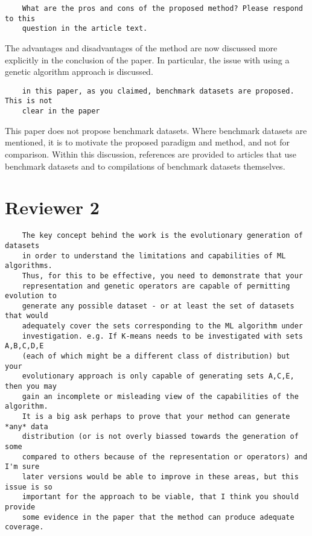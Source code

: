 \documentclass[11pt]{article}
\begin{document}
\begin{tcolorbox}
\begin{verbatim}
    What are the pros and cons of the proposed method? Please respond to this
    question in the article text.
\end{verbatim}
\end{tcolorbox}

The advantages and disadvantages of the method are now discussed more explicitly
in the conclusion of the paper. In particular, the issue with using a genetic
algorithm approach is discussed.\\


\begin{tcolorbox}
\begin{verbatim}
    in this paper, as you claimed, benchmark datasets are proposed. This is not
    clear in the paper
\end{verbatim}
\end{tcolorbox}

This paper does not propose benchmark datasets. Where benchmark datasets are
mentioned, it is to motivate the proposed paradigm and method, and not for
comparison. Within this discussion, references are provided to articles that use
benchmark datasets and to compilations of benchmark datasets themselves.

\section*{Reviewer 2}

\begin{tcolorbox}
\begin{verbatim}
    The key concept behind the work is the evolutionary generation of datasets
    in order to understand the limitations and capabilities of ML algorithms.
    Thus, for this to be effective, you need to demonstrate that your
    representation and genetic operators are capable of permitting evolution to
    generate any possible dataset - or at least the set of datasets that would
    adequately cover the sets corresponding to the ML algorithm under
    investigation. e.g. If K-means needs to be investigated with sets A,B,C,D,E
    (each of which might be a different class of distribution) but your
    evolutionary approach is only capable of generating sets A,C,E, then you may
    gain an incomplete or misleading view of the capabilities of the algorithm.
    It is a big ask perhaps to prove that your method can generate *any* data
    distribution (or is not overly biassed towards the generation of some
    compared to others because of the representation or operators) and I'm sure
    later versions would be able to improve in these areas, but this issue is so
    important for the approach to be viable, that I think you should provide
    some evidence in the paper that the method can produce adequate coverage.
\end{verbatim}
\end{tcolorbox}
\end{document}
